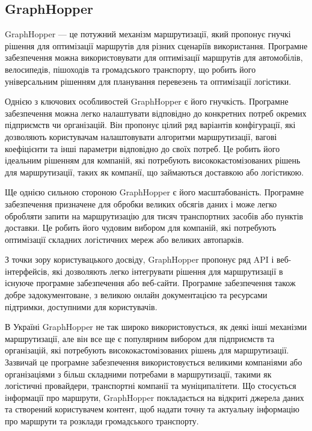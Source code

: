\subsection{GraphHopper}
\label{subsec:graphhopper-subsection}

GraphHopper --- це потужний механізм маршрутизації, який пропонує 
гнучкі рішення для оптимізації маршрутів для різних сценаріїв 
використання. Програмне забезпечення можна використовувати для 
оптимізації маршрутів для автомобілів, велосипедів, пішоходів та 
громадського транспорту, що робить його універсальним рішенням для 
планування перевезень та оптимізації логістики.

Однією з ключових особливостей GraphHopper є його гнучкість. Програмне 
забезпечення можна легко налаштувати відповідно до конкретних потреб 
окремих підприємств чи організацій. Він пропонує цілий ряд варіантів 
конфігурації, які дозволяють користувачам налаштовувати алгоритми 
маршрутизації, вагові коефіцієнти та інші параметри відповідно до 
своїх потреб. Це робить його ідеальним рішенням для компаній, які 
потребують висококастомізованих рішень для маршрутизації, таких як 
компанії, що займаються доставкою або логістикою.

Ще однією сильною стороною GraphHopper є його масштабованість. 
Програмне забезпечення призначене для обробки великих обсягів даних і 
може легко обробляти запити на маршрутизацію для тисяч транспортних 
засобів або пунктів доставки. Це робить його чудовим вибором для 
компаній, які потребують оптимізації складних логістичних мереж або 
великих автопарків.

З точки зору користувацького досвіду, GraphHopper пропонує ряд API і 
веб-інтерфейсів, які дозволяють легко інтегрувати рішення для 
маршрутизації в існуюче програмне забезпечення або веб-сайти. 
Програмне забезпечення також добре задокументоване, з великою онлайн 
документацією та ресурсами підтримки, доступними для користувачів.

В Україні GraphHopper не так широко використовується, як деякі інші 
механізми маршрутизації, але він все ще є популярним вибором для 
підприємств та організацій, які потребують висококастомізованих рішень 
для маршрутизації. Зазвичай це програмне забезпечення використовується 
великими компаніями або організаціями з більш складними потребами в 
маршрутизації, такими як логістичні провайдери, транспортні компанії 
та муніципалітети. Що стосується інформації про маршрути, GraphHopper 
покладається на відкриті джерела даних та створений користувачем 
контент, щоб надати точну та актуальну інформацію про маршрути та 
розклади громадського транспорту.\\


